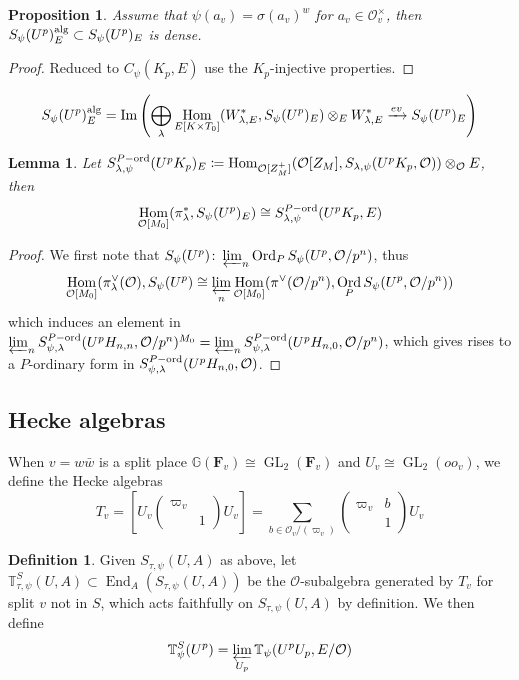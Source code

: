 \documentclass[leqno]{amsart}
\newcommand{\smat}[1]{\left( \begin{smallmatrix} #1 \end{smallmatrix} \right)}
\DeclareMathOperator{\Ord}{Ord}
\newcommand{\alg}{\textnormal{alg}}
\newcommand{\ord}{\textnormal{ord}}
\newcommand{\GG}{\mathbb G}
\DeclareMathOperator{\GL}{GL}
\newcommand{\F}{{\mathbf{F}}} %
\newcommand{\oo}{\mathcal O}
\newcommand{\TT}{\mathbb{T}}
\newcommand{\1}{\mathbf{1}}
\DeclareMathOperator{\End}{End}
\DeclareMathOperator{\Hom}{Hom}
\DeclareMathOperator{\Image}{Im}
\newtheorem{lem}[thm]{Lemma}
\newtheorem{prop}[thm]{Proposition}
\theoremstyle{definition}
\newtheorem{defn}[thm]{Definition}
\theoremstyle{remark}
\begin{document}
\begin{prop}
Assume that $\psi(a_v)=\sigma(a_v)^w$
for  $a_v\in \oo_v^\times$,
then $S_\psi(U^p)_E^{\alg}\subset S_\psi(U^p)_E$
is dense.
\end{prop}
\begin{proof}
	Reduced to $C_\psi(K_p,E)$ use the  $K_p$-injective properties.
\end{proof}
\[
S_\psi(U^p)_E^{\alg}=
\Image\left(
	\bigoplus_{\lambda}\Hom_{E[K\times T_0]}(W_{\lambda,E}^*, 
	S_\psi(U^p)_E)
	\otimes_EW_{\lambda,E}^*\xrightarrow{ev}
	S_\psi(U^p)_E
\right)
\]

\begin{lem}
	Let $S_{\lambda,\psi}^{P-\ord}(U^pK_p)_E
	\coloneqq \Hom_{\oo[Z_M^+]}
	(\oo[Z_M], S_{\lambda,\psi}(U^pK_p,\oo))\otimes_\oo E$,
	then
	\[
		\Hom_{\oo[M_0]}(\pi_\lambda^*, S_\psi(U^p)_E)\cong
		S_{\lambda,\psi}^{P-\ord}(U^pK_p,E)
	\]
\end{lem}
\begin{proof}
	We first note that 
	$S_\psi(U^p)\colon \varprojlim_{n}\Ord_PS_\psi(U^p, \oo/p^n)$,
	thus 
	\[
		\Hom_{\oo[M_0]}(\pi_\lambda^\vee(\oo),S_\psi(U^p)\cong
		\varprojlim_{n}\Hom_{\oo[M_0]}(\pi^\vee(\oo/p^n),
		\Ord_PS_\psi(U^p,\oo/p^n))
	\]
	which induces an element in 
	$\varprojlim_n S_{\psi,\lambda}^{P-\ord}(U^pH_{n,n},\oo/p^n)^{M_0}
	=\varprojlim_n S_{\psi,\lambda}^{P-\ord}(U^pH_{n,0},\oo/p^n)$,
	which gives rises to a $P$-ordinary form in 
	$S_{\psi,\lambda}^{P-\ord}(U^pH_{n,0},\oo)$.
\end{proof}



\subsection{Hecke algebras}

When $v=w\bar{w}$ is a split place
$\GG(\F_v)\cong \GL_2(\F_v)$ and 
$U_v\cong \GL_2(oo_v)$, we define the Hecke algebras
\[
	T_v=[U_v\smat{\varpi_v&\\&1}U_v]=
	\sum_{b\in \oo_v/(\varpi_v)}\smat{\varpi_v&b\\&1}U_v
\]
\begin{defn}
	Given $S_{\tau,\psi}(U,A)$ as above, 
	let $\TT^S_{\tau,\psi}(U,A)\subset \End_A(S_{\tau,\psi}(U,A))$
	be the $\oo$-subalgebra generated by  $T_v$
	for  split $v$ not in  $S$,
	which acts faithfully on $S_{\tau,\psi}(U,A)$
	by definition. 
	We then define 
	\[
		\TT^S_\psi(U^p)=\varprojlim_{U_p}
		\TT_{\psi}(U^pU_p, E/\oo)
	\]
\end{defn}
\end{document}
